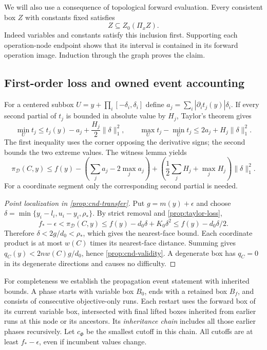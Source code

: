 We will also use a consequence of topological forward evaluation. Every
consistent box $Z$ with constants fixed satisfies
\begin{equation}
 Z\subseteq Z_0(\Pi_xZ).
 \label{prop:own-forward}
\end{equation}
Indeed variables and constants satisfy this inclusion first. Supporting
each operation-node endpoint shows that its interval is contained in its
forward operation image. Induction through the graph proves the claim.

\subsection{First-order loss and owned event accounting}
\label{app:propagation-transfer}

For a centered subbox $U=y+\prod_i[-\delta_i,\delta_i]$ define
$a_j=\sum_i|\partial_it_j(y)|\delta_i$. If every second partial of $t_j$
is bounded in absolute value by $H_j$, Taylor's theorem gives
\[
 \min_Ut_j\le t_j(y)-a_j+\frac{H_j}2\|\delta\|_1^2,
 \qquad
 \max_Ut_j-\min_Ut_j\le2a_j+H_j\|\delta\|_1^2.
\]
The first inequality uses the corner opposing the derivative signs;
the second bounds the two extreme values. The witness lemma yields
\begin{equation}
 \pi_{\mathcal D}(C,y)\le f(y)-
 \left(\sum_ja_j-2\max_ja_j\right)
 +\left(\frac12\sum_jH_j+\max_jH_j\right)\|\delta\|_1^2.
 \label{prop:taylor-loss}
\end{equation}
For a coordinate segment only the corresponding second partial is needed.

\begin{proof}[Point localization in \cref{prop:cnd-transfer}]
Put $g=m(y)+\epsilon$ and choose
$\delta=\min\{y_i-l_i,u_i-y_i,\rho_*\}$. By strict removal and
\eqref{prop:taylor-loss},
\[
 f_* -\epsilon<\pi_{\mathcal D}(C,y)
 \le f(y)-d_0\delta+K_0\delta^2
 \le f(y)-d_0\delta/2.
\]
Therefore $\delta<2g/d_0<\rho_*$, which gives the nearest-face bound.
Each coordinate product is at most $w(C)$ times its nearest-face
distance. Summing gives $q_C(y)<2nw(C)g/d_0$, hence
\eqref{prop:cnd-validity}. A degenerate box has $q_C=0$ in its
degenerate directions and causes no difficulty.
\end{proof}

For completeness we establish the propagation event statement with
inherited bounds. A phase starts with variable box $B_0$, ends with a
retained box $B_f$, and consists of consecutive objective-only runs.
Each restart uses the forward box of its current variable box, intersected
with final lifted boxes inherited from earlier runs at this node or its
ancestors. Its \emph{inheritance chain} includes all those earlier phases
recursively. Let $c_\Phi$ be the smallest cutoff in this chain. All cutoffs
are at least $f_* -\epsilon$, even if incumbent values change.

